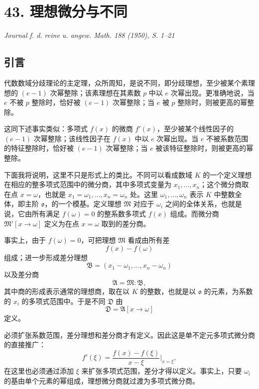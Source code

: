 \section*{43. 理想微分与不同}

\begin{center}
\emph{Journal f. d. reine u. angew. Math. 188 (1950), S. 1--21}
\end{center}

\subsection*{引言}

代数数域分歧理论的主定理，众所周知，是说不同，即分歧理想，至少被某个素理想的 \((e-1)\) 次幂整除；该素理想在其素数 \(p\) 中以 \(e\) 次幂出现。更准确地说，当 \(e\) 不被 \(p\) 整除时，恰好被 \((e-1)\) 次幂整除；当 \(e\) 被 \(p\) 整除时，则被更高的幂整除。

这同下述事实类似：多项式 \(f(x)\) 的微商 \(f'(x)\)，至少被某个线性因子的 \((e-1)\) 次幂整除；该线性因子在 \(f(x)\) 中以 \(e\) 次幂出现。当 \(e\) 不被系数范围的特征整除时，恰好被 \((e-1)\) 次幂整除；当 \(e\) 被该特征整除时，则被更高的幂整除。

下面我将说明，这里不只是形式上的类比。不同可以看成数域 \(K\) 的一个定义理想在相应的整多项式范围中的微分商，其中多项式变量为 \(x_1,\ldots,x_n\)；这个微分商取在点 \(x=\omega\)，也就是 \(x_1=\omega_1,\ldots,x_n=\omega_n\) 处。这里 \(\omega_1,\ldots,\omega_n\) 表示 \(K\) 中整数全体，即主阶 \(\mathfrak o\)，的一个模基。定义理想 \(\mathfrak M\) 对应于 \(\omega_i\) 之间的全体关系，也就是说，它由所有满足 \(f(\omega)=0\) 的整系数多项式 \(f(x)\) 组成。而微分商 \(\mathfrak M'[x\to\omega]\) 定义为在点 \(x=\omega\) 取到的差分商。

事实上，由于 \(f(\omega)=0\)，可把理想 \(\mathfrak M\) 看成由所有差
\[
        f(x)-f(\omega)
\]
组成；进一步形成差分理想
\[
        \mathfrak B=(x_1-\omega_1,\ldots,x_n-\omega_n)
\]
以及差分商
\[
        \mathfrak A=\mathfrak M:\mathfrak B,
\]
其中商的形成表示通常的理想商，取在以 \(K\) 的整数，也就是以 \(\mathfrak o\) 的元素，为系数的 \(x_i\) 的多项式范围中。于是不同 \(\mathfrak D\) 由
\[
        \mathfrak D=\mathfrak A[x\to\omega]
\]
定义。

必须扩张系数范围，差分理想和差分商才有定义。因此这是单不定元多项式微分商的直接推广：
\[
        f'(\xi)=\frac{f(x)-f(\xi)}{x-\xi}\bigg|_{x=\xi},
\]
在这里也必须通过添加 \(\xi\) 来扩张多项式范围，差分才得以定义。事实上，只要 \(\omega_i\) 的基由单个元素的幂组成，理想微分商就过渡为多项式微分商。

